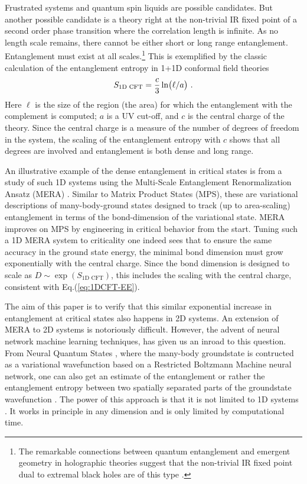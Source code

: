 Frustrated systems and quantum spin liquids are possible candidates. But another possible candidate is a theory right at the non-trivial IR fixed point of a second order phase transition where the correlation length is infinite. As no length scale remains, there cannot be either short or long range entanglement. Entanglement must exist at all scales.\footnote{The remarkable connections between quantum entanglement and emergent geometry in holographic theories suggest that the non-trivial IR fixed point dual to extremal black holes are of this type \cite{zaanenHolographicDualityCondensed2015,hartnollHolographicQuantumMatter2018}.} This is exemplified by the classic calculation of the entanglement entropy in 1+1D conformal field theories \cite{Holzhey:1994we}
\begin{equation}
	\label{eq:1DCFT-EE}
	S_{\text{1D CFT}} = \frac{c}{3}\ln(\ell/a) \ .
\end{equation}
Here $\ell$ is the size of the region (the area) for which the entanglement with the complement is computed; $a$ is a UV cut-off, and $c$ is the central charge of the theory. Since the central charge is a measure of the number of degrees of freedom in the system, the scaling of the entanglement entropy with $c$ shows that all degrees are involved and entanglement is both dense and long range.

An illustrative example of the dense entanglement in critical states is from a study of such 1D systems using the Multi-Scale Entanglement Renormalization Ansatz (MERA) \cite{Evenbly2013}. Similar to Matrix Product States (MPS), these are variational descriptions of many-body-ground states designed to track (up to area-scaling) entanglement in terms of the bond-dimension of the variational state. MERA improves on MPS by engineering in critical behavior from the start. Tuning such a 1D MERA system to criticality one indeed sees that to ensure the same accuracy in the ground state energy, the minimal bond dimension must grow exponentially with the central charge. Since the bond dimension is designed to scale as $D \sim \exp(S_{\text{1D CFT}})$, this includes the scaling with the central charge, consistent with Eq.(\ref{eq:1DCFT-EE}).

The aim of this paper is to verify that this similar exponential increase in entanglement at critical states also happens in 2D systems. An extension of MERA to 2D systems is notoriously difficult. However, the advent of neural network machine learning techniques, has given us an inroad to this question. From Neural Quantum States \cite{doi:10.1126/science.aag2302, Vicentini:2021pcv}, where the many-body groundstate is contructed as a variational wavefunction based on a Restricted Boltzmann Machine neural network, one can also get an estimate of the entanglement or rather the entanglement entropy between two spatially separated parts of the groundstate wavefunction \cite{Shi_2019}. The power of this approach is that it is not limited to 1D systems \cite{Vicentini:2021pcv}. It works in principle in any dimension and is only limited by computational time. 

